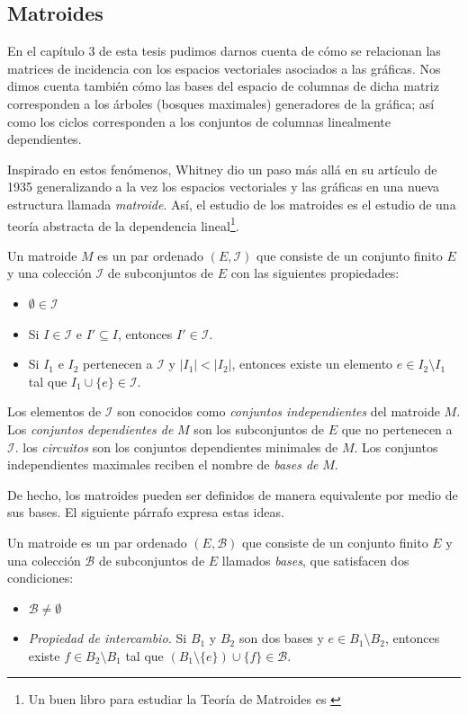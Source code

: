 \subsection{Matroides}
En el capítulo 3 de esta tesis pudimos darnos cuenta de cómo se relacionan las matrices de incidencia con los espacios vectoriales asociados a las gráficas. Nos dimos cuenta también cómo las bases del espacio de columnas de dicha matriz corresponden a los árboles (bosques maximales) generadores de la gráfica; así como los ciclos corresponden a los conjuntos de columnas linealmente dependientes.

Inspirado en estos fenómenos, Whitney dio un paso más allá en su artículo \cite{Whitney1935} de 1935 generalizando a la vez los espacios vectoriales y las gráficas en una nueva estructura llamada \textit{matroide}. Así, el estudio de los matroides es el estudio de una teoría abstracta de la dependencia lineal\footnote{Un buen libro para estudiar la Teoría de Matroides es \cite{Oxley}}.

Un matroide $M$ es un par ordenado $(E,\mathcal{I})$ que consiste de un conjunto finito $E$ y una colección $\mathcal{I}$ de subconjuntos de $E$ con las siguientes propiedades:

\begin{itemize}
    \item $\emptyset \in \mathcal{I}$
    \item Si $I\in \mathcal{I}$ e $I' \subseteq I$, entonces $I'\in \mathcal{I}$.
    \item Si $I_{1}$ e $I_{2}$ pertenecen a $\mathcal{I}$ y $|I_{1}|<|I_{2}|$, entonces existe un elemento $e \in I_{2} \setminus I_{1}$ tal que $I_{1} \cup \{e\} \in \mathcal{I}.$
\end{itemize}

Los elementos de $\mathcal{I}$ son conocidos como \textit{conjuntos independientes} del matroide $M$. Los \textit{conjuntos dependientes de} $M$ son los subconjuntos de $E$ que no pertenecen a $\mathcal{I}$. los \textit{circuitos} son los conjuntos dependientes minimales de $M$. Los conjuntos independientes maximales reciben el nombre de \textit{bases de} $M$. 

De hecho, los matroides pueden ser definidos de manera equivalente por medio de sus bases. El siguiente párrafo expresa estas ideas.

Un matroide es un par ordenado $(E, \mathcal{B})$ que consiste de un conjunto finito $E$ y una colección $\mathcal{B}$ de subconjuntos de $E$ llamados \textit{bases}, que satisfacen dos condiciones:
\begin{itemize}
    \item $\mathcal{B} \neq \emptyset$
    \item \textit{Propiedad de intercambio.} Si $B_{1}$ y $B_{2}$ son dos bases y $e \in B_{1}\setminus B_{2}$, entonces existe $f \in B_{2}\setminus B_{1}$ tal que $(B_{1} \setminus \{e\})\cup \{f\} \in \mathcal{B}$.
\end{itemize}

